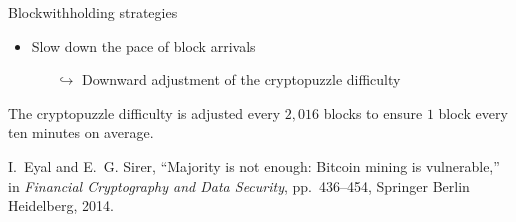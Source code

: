 \documentclass{beamer}
\begin{document}
\begin{frame}{Blockwithholding strategies}
\begin{itemize}
\begin{itemize}
  \end{itemize}
  \item Slow down the pace of block arrivals
  \begin{itemize}
    \scriptsize
    \item[$\hookrightarrow$] Downward adjustment of the cryptopuzzle difficulty
  \end{itemize}
\end{itemize}
\begin{tcolorbox}[enhanced,drop shadow, title=Difficulty adjustments]
The cryptopuzzle difficulty is adjusted every $2,016$ blocks to ensure $1$ block every ten minutes on average.
\end{tcolorbox}
\tiny
\begin{thebibliography}{1}
I.~Eyal and E.~G. Sirer, ``Majority is not enough: Bitcoin mining is
  vulnerable,'' in {\em Financial Cryptography and Data Security},
  pp.~436--454, Springer Berlin Heidelberg, 2014.
\end{thebibliography}
\end{frame}
\end{document}
